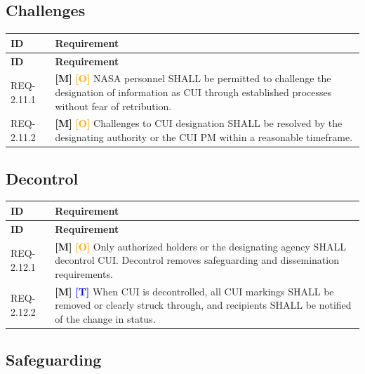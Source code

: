 \documentclass[11pt,letterpaper]{article}
\begin{document}
\subsection{Challenges}

\begin{longtable}{@{}p{1.4cm}p{11.6cm}@{}}
\toprule
\textbf{ID} & \textbf{Requirement} \\
\midrule
\endfirsthead
\toprule
\textbf{ID} & \textbf{Requirement} \\
\midrule
\endhead

REQ-2.11.1 & \textcolor{mandatory}{\textbf{[M]}} \textcolor{orange}{\textbf{[O]}} NASA personnel SHALL be permitted to challenge the designation of information as CUI through established processes without fear of retribution. \\[6pt]

REQ-2.11.2 & \textcolor{mandatory}{\textbf{[M]}} \textcolor{orange}{\textbf{[O]}} Challenges to CUI designation SHALL be resolved by the designating authority or the CUI PM within a reasonable timeframe. \\[6pt]

\bottomrule
\end{longtable}

\subsection{Decontrol}

\begin{longtable}{@{}p{1.4cm}p{11.6cm}@{}}
\toprule
\textbf{ID} & \textbf{Requirement} \\
\midrule
\endfirsthead
\toprule
\textbf{ID} & \textbf{Requirement} \\
\midrule
\endhead

REQ-2.12.1 & \textcolor{mandatory}{\textbf{[M]}} \textcolor{orange}{\textbf{[O]}} Only authorized holders or the designating agency SHALL decontrol CUI. Decontrol removes safeguarding and dissemination requirements. \\[6pt]

REQ-2.12.2 & \textcolor{mandatory}{\textbf{[M]}} \textcolor{blue}{\textbf{[T]}} When CUI is decontrolled, all CUI markings SHALL be removed or clearly struck through, and recipients SHALL be notified of the change in status. \\[6pt]

\bottomrule
\end{longtable}

\subsection{Safeguarding}
\end{document}
